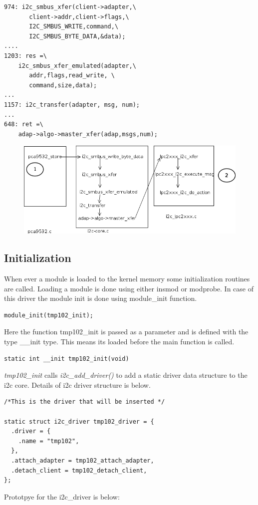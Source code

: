 \documentclass{article}
\begin{document}
\begin{verbatim}
974: i2c_smbus_xfer(client->adapter,\
       client->addr,client->flags,\
       I2C_SMBUS_WRITE,command,\
       I2C_SMBUS_BYTE_DATA,&data);
....
1203: res =\
    i2c_smbus_xfer_emulated(adapter,\
       addr,flags,read_write, \
       command,size,data);
...
1157: i2c_transfer(adapter, msg, num);
...
648: ret =\
    adap->algo->master_xfer(adap,msgs,num);
\end{verbatim}

\begin{figure}[h]
\label{fig: i2c driver write process}
\includegraphics[width=\linewidth]{./write_i2c_flow.png}
\caption[i2c driver write process]{}
\end{figure}



\subsection{Initialization}
When ever a module is loaded to the kernel memory some initialization routines are called. Loading a module is done using either insmod or modprobe. In case of this driver the module init is done using module\_init function. 
\begin{verbatim}
module_init(tmp102_init);
\end{verbatim}
Here the function tmp102\_init is passed as a parameter and is defined with the type \_\_init type. This means its loaded before the main function is called. 
\begin{verbatim}
static int __init tmp102_init(void)
\end{verbatim}
\emph{tmp102\_init} calls \emph{i2c\_add\_driver()} to add a static driver data structure to the i2c core. Details of i2c driver structure is below.
\begin{verbatim}
/*This is the driver that will be inserted */ 

static struct i2c_driver tmp102_driver = { 
  .driver = { 
    .name = "tmp102", 
  }, 
  .attach_adapter = tmp102_attach_adapter, 
  .detach_client = tmp102_detach_client, 
};
\end{verbatim}
Prototpye for the i2c\_driver is below:
\end{document}
